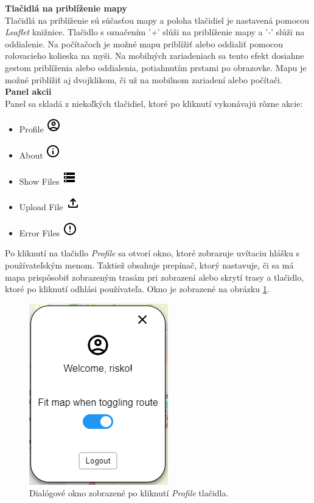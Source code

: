 \noindent\textbf{Tlačidlá na priblíženie mapy}\\
\indent Tlačidlá na priblíženie sú súčasťou mapy a poloha tlačidiel je nastavená pomocou \textit{Leaflet} knižnice\cite{leaflet}. Tlačidlo s označením '\textit{+}' slúži na priblíženie mapy a '\textit{-}' slúži na oddialenie. Na počítačoch je možné mapu priblížiť alebo oddialiť pomocou rolovacieho kolieska na myši. Na mobilných zariadeniach sa tento efekt dosiahne gestom priblíženia alebo oddialenia, potiahnutím prstami po obrazovke. Mapu je možné priblížiť aj dvojklikom, či už na mobilnom zariadení alebo počítači.\\

\noindent\textbf{Panel akcii}\\
\indent Panel sa skladá z niekoľkých tlačidiel, ktoré po kliknutí vykonávajú rôzne akcie:
\begin{itemize}
  \item Profile \includegraphics{img/icons/profile.png}
  \item About \includegraphics{img/icons/info.png}
  \item Show Files \includegraphics{img/icons/files.png}
  \item Upload File \includegraphics{img/icons/upload.png}
  \item Error Files \includegraphics{img/icons/error.png}
\end{itemize}

Po kliknutí na tlačidlo \textit{Profile} sa otvorí  okno, ktoré zobrazuje uvítaciu hlášku s používateľským menom. Taktiež obsahuje prepínač, ktorý nastavuje, či sa má mapa prispôsobiť zobrazeným trasám pri zobrazení alebo skrytí trasy a tlačidlo, ktoré po kliknutí odhlási používateľa. Okno je zobrazené na obrázku \ref{fig:profile_dialog}.

\begin{figure}[H]
  \centering
  \includegraphics[width=0.2 \textwidth]{img/tools-panel/profile-dialog.png}
  \caption{Dialógové okno zobrazené po kliknutí \textit{Profile} tlačidla.}
  \label{fig:profile_dialog}
\end{figure}

